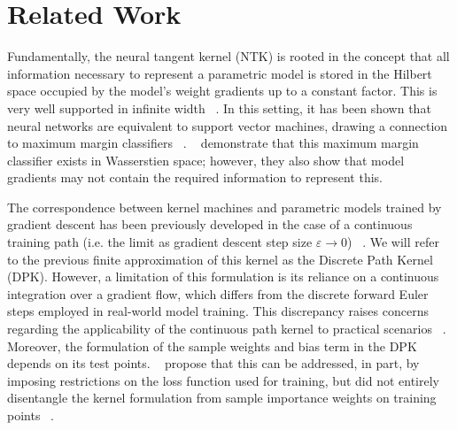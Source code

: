 \section{Related Work}

Fundamentally, the neural tangent kernel (NTK) is rooted in the concept that all information necessary to represent a parametric model is stored in the Hilbert space occupied by the model's weight gradients up to a constant factor. 
This is very well supported in infinite width ~\citep{jacot2018neural}. 
In this setting, it has been shown that neural networks are equivalent to support vector machines, drawing a connection to maximum margin classifiers ~\citep{chen2021equivalence, chizat2020maxmargin}. ~\citet{shah2021input} demonstrate that this maximum margin classifier exists in Wasserstien space; however, they also show that model gradients may not contain the required information to represent this.

The correspondence between kernel machines and parametric models trained by gradient descent has been previously developed in the case of a continuous training path (i.e. the limit as gradient descent step size $\varepsilon \to 0$)
~\citep{domingos2020}. We will refer to the previous finite approximation of this kernel as the Discrete Path Kernel (DPK).
However, a limitation of this formulation is its reliance on a continuous integration over a gradient flow, which differs from the discrete forward Euler steps employed in real-world model training. 
This discrepancy raises concerns regarding the applicability of the continuous path kernel to practical scenarios ~\citep{incudini2022quantum}.
Moreover, the formulation of the sample weights and bias term in the DPK depends on its test points. ~\citet{chen2021equivalence} propose that this can be addressed, in part, by imposing restrictions on the loss function used for training, but did not entirely disentangle the kernel formulation from sample importance weights on training points ~\citep{chen2021equivalence}.

